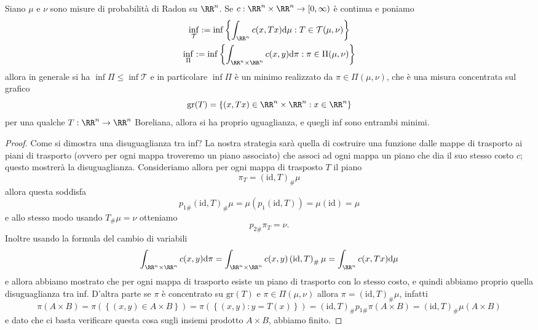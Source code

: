 \documentclass[11pt]{scrartcl}
\newcommand{\dif}{\text{d}}
\begin{document}
	\begin{theorem}
		Siano $\mu$ e $\nu$ sono misure di probabilità di Radon su $\RR^n$. Se $c:\RR^n\times \RR^n\to[0,\infty)$ è continua e poniamo 
		\begin{gather*}
			\inf_\mathcal{T}:=\inf\left\{\int_{\RR^n} c(x,Tx)\dif \mu:T\in \mathcal{T}(\mu,\nu)\right\} \\
			\inf_\Pi:=\inf\left\{\int_{\RR^n\times \RR^n} c(x,y)\dif\pi:\pi\in \Pi(\mu,\nu)\right\}
		\end{gather*}
		allora in generale si ha $\inf\Pi\le \inf \mathcal{T}$ e in particolare $\inf\Pi$ è un minimo realizzato da $\pi\in \Pi(\mu,\nu)$, che è una misura concentrata sul grafico
		$$\text{gr}(T)=\left\{(x,Tx)\in \RR^n\times\RR^n:x\in \RR^n\right\}$$
		per una qualche $T:\RR^n\to\RR^n$ Boreliana, allora si ha proprio uguaglianza, e quegli inf sono entrambi minimi.
	\end{theorem}
	\begin{proof}
		Come si dimostra una disuguaglianza tra inf? La nostra strategia sarà quella di costruire una funzione dalle mappe di trasporto ai piani di trasporto (ovvero per ogni mappa troveremo un piano associato) che associ ad ogni mappa un piano che dia il suo stesso costo $c$; questo mostrerà la disuguaglianza. Consideriamo allora per ogni mappa di trasposto $T$ il piano
		$$\pi_T=(\text{id},T)_\#\mu$$
		allora questa soddisfa
		$$p_{1\#}(\text{id},T)_\#\mu=\mu\left(p_1(\text{id},T)\right)=\mu(\text{id})=\mu$$
		e allo stesso modo usando $T_\#\mu=\nu$ otteniamo 
		$$p_{2\#}\pi_T=\nu.$$
		Inoltre usando la formula del cambio di variabili
		$$\int_{\RR^n\times\RR^n}c(x,y)\dif \pi=\int_{\RR^n\times\RR^n}c(x,y)\left(\text{id},T\right)_\#\mu=\int_{\RR^n}c(x,Tx)\dif \mu$$
		e allora abbiamo mostrato che per ogni mappa di trasporto esiste un piano di trasporto con lo stesso costo, e quindi abbiamo proprio quella disuguaglianza tra inf. D'altra parte se $\pi$ è concentrato su $\text{gr}(T)$ e $\pi\in \Pi(\mu,\nu)$ allora $\pi=(\text{id},T)_\#\mu$, infatti
		$$\pi(A\times B)=\pi\left(\left\{(x,y)\in A\times B\right\}\right)=\pi\left(\left\{(x,y):y=T(x)\right\}\right)=\left(\text{id},T\right)_\# p_{1\#}\pi(A\times B)=(\text{id},T)_\#\mu(A\times B)$$
		e dato che ci basta verificare questa cosa sugli insiemi prodotto $A\times B$, abbiamo finito.
	\end{proof}
	
\end{document}
